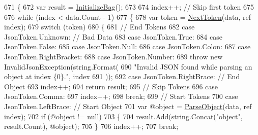 \begin{DoxyCode}
671         \{
672             var result = \hyperlink{a00060_a9f62c2e79312364d7161b13a64b89c8e}{InitializeBag}();
673 
674             index++; \textcolor{comment}{// Skip first token}
675 
676             \textcolor{keywordflow}{while} (index < data.Count - 1)
677             \{
678                 var token = \hyperlink{a00060_a1d2daab9b052b186da7a2b6711be5803}{NextToken}(data, ref index);
679                 \textcolor{keywordflow}{switch} (token)
680                 \{
681                     \textcolor{comment}{// End Tokens}
682                     \textcolor{keywordflow}{case} JsonToken.Unknown:             \textcolor{comment}{// Bad Data}
683                     \textcolor{keywordflow}{case} JsonToken.True:
684                     \textcolor{keywordflow}{case} JsonToken.False:
685                     \textcolor{keywordflow}{case} JsonToken.Null:
686                     \textcolor{keywordflow}{case} JsonToken.Colon:
687                     \textcolor{keywordflow}{case} JsonToken.RightBracket:
688                     \textcolor{keywordflow}{case} JsonToken.Number:
689                         \textcolor{keywordflow}{throw} \textcolor{keyword}{new} InvalidJsonException(\textcolor{keywordtype}{string}.Format(
690                             \textcolor{stringliteral}{"Invalid JSON found while parsing an object at index \{0\}."}, index
691                             ));
692                     \textcolor{keywordflow}{case} JsonToken.RightBrace:          \textcolor{comment}{// End Object}
693                         index++;
694                         \textcolor{keywordflow}{return} result;
695                     \textcolor{comment}{// Skip Tokens}
696                     \textcolor{keywordflow}{case} JsonToken.Comma:
697                         index++;
698                         \textcolor{keywordflow}{break};
699                     \textcolor{comment}{// Start Tokens}
700                     \textcolor{keywordflow}{case} JsonToken.LeftBrace:           \textcolor{comment}{// Start Object}
701                         var @\textcolor{keywordtype}{object} = \hyperlink{a00060_a49577a43cf31e147b6d46ea28f7f617e}{ParseObject}(data, ref index);
702                         \textcolor{keywordflow}{if} (@\textcolor{keywordtype}{object} != null)
703                         \{
704                             result.Add(string.Concat(\textcolor{stringliteral}{"object"}, result.Count), @\textcolor{keywordtype}{object});
705                         \}
706                         index++;
707                         \textcolor{keywordflow}{break};

\end{DoxyCode}
